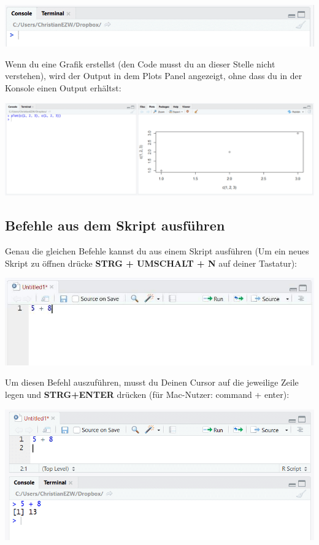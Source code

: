 \documentclass[
]{book}
\begin{document}
\includegraphics{images/02_grundlagen/console.png}

Wenn du eine Grafik erstellst (den Code musst du an dieser Stelle nicht verstehen), wird der Output in dem Plots Panel angezeigt, ohne dass du in der Konsole einen Output erhältst:

\includegraphics{images/02_grundlagen/plot.png}

\hypertarget{befehle-aus-dem-skript-ausfuxfchren}{%
\subsection{Befehle aus dem Skript ausführen}\label{befehle-aus-dem-skript-ausfuxfchren}}

Genau die gleichen Befehle kannst du aus einem Skript ausführen (Um ein neues Skript zu öffnen drücke \textbf{STRG + UMSCHALT + N} auf deiner Tastatur):

\includegraphics{images/02_grundlagen/befehle_skrip.jpg}

Um diesen Befehl auszuführen, musst du Deinen Cursor auf die jeweilige Zeile legen und \textbf{STRG+ENTER} drücken (für Mac-Nutzer: command + enter):

\includegraphics{images/02_grundlagen/befehle_skript1.png}
\end{document}
